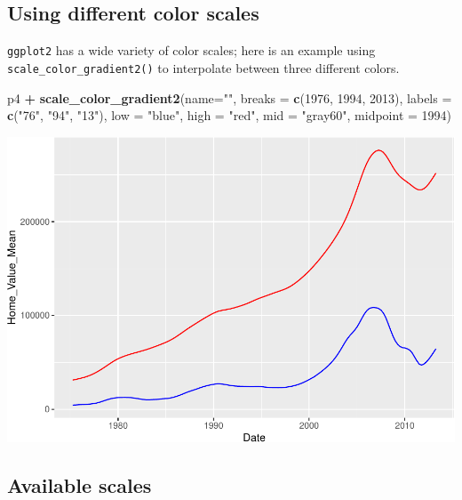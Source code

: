 \documentclass[
]{book}
\newenvironment{Shaded}{\begin{snugshade}}{\end{snugshade}}
\newcommand{\DataTypeTok}[1]{\textcolor[rgb]{0.13,0.29,0.53}{#1}}
\newcommand{\DecValTok}[1]{\textcolor[rgb]{0.00,0.00,0.81}{#1}}
\newcommand{\KeywordTok}[1]{\textcolor[rgb]{0.13,0.29,0.53}{\textbf{#1}}}
\newcommand{\NormalTok}[1]{#1}
\newcommand{\OperatorTok}[1]{\textcolor[rgb]{0.81,0.36,0.00}{\textbf{#1}}}
\newcommand{\StringTok}[1]{\textcolor[rgb]{0.31,0.60,0.02}{#1}}
\begin{document}
\hypertarget{using-different-color-scales}{%
\subsection{Using different color scales}\label{using-different-color-scales}}

\texttt{ggplot2} has a wide variety of color scales; here is an example using \texttt{scale\_color\_gradient2()} to interpolate between three different colors.

\begin{Shaded}
\begin{Highlighting}[]
\NormalTok{p4 }\OperatorTok{+}
\StringTok{  }\KeywordTok{scale\_color\_gradient2}\NormalTok{(}\DataTypeTok{name=}\StringTok{""}\NormalTok{,}
                        \DataTypeTok{breaks =} \KeywordTok{c}\NormalTok{(}\DecValTok{1976}\NormalTok{, }\DecValTok{1994}\NormalTok{, }\DecValTok{2013}\NormalTok{),}
                        \DataTypeTok{labels =} \KeywordTok{c}\NormalTok{(}\StringTok{"\textquotesingle{}76"}\NormalTok{, }\StringTok{"\textquotesingle{}94"}\NormalTok{, }\StringTok{"\textquotesingle{}13"}\NormalTok{),}
                        \DataTypeTok{low =} \StringTok{"blue"}\NormalTok{,}
                        \DataTypeTok{high =} \StringTok{"red"}\NormalTok{,}
                        \DataTypeTok{mid =} \StringTok{"gray60"}\NormalTok{,}
                        \DataTypeTok{midpoint =} \DecValTok{1994}\NormalTok{)}
\end{Highlighting}
\end{Shaded}

\includegraphics{R/Rgraphics/figures/unnamed-chunk-185-1.pdf}

\hypertarget{available-scales}{%
\subsection{Available scales}\label{available-scales}}
\end{document}
